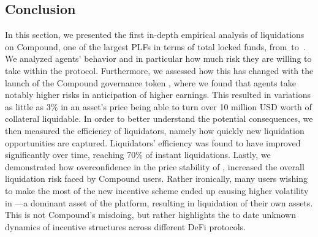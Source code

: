 \subsection{Conclusion}
\label{sec:conclusion}
In this section, we presented the first in-depth empirical analysis of liquidations on Compound, one of the largest PLFs in terms of total locked funds, from~\StartDate to~\EndDate.
We analyzed agents' behavior and in particular how much risk they are willing to take within the protocol.
Furthermore, we assessed how this has changed with the launch of the Compound governance token , where we found that agents take notably higher risks in anticipation of higher earnings.
This resulted in variations as little as 3\% in an asset's price being able to turn over 10 million USD worth of collateral liquidable.
In order to better understand the potential consequences, we then measured the efficiency of liquidators, namely how quickly new liquidation opportunities are captured. Liquidators' efficiency was found to have improved significantly over time, reaching 70\% of instant liquidations.
Lastly, we demonstrated how overconfidence in the price stability of , increased the overall liquidation risk faced by Compound users.
Rather ironically, many users wishing to make the most of the new incentive scheme ended up causing higher volatility in ---a dominant asset of the platform, resulting in liquidation of their own assets.
This is not Compound's misdoing, but rather highlights the to date unknown dynamics of incentive structures across different DeFi protocols.
